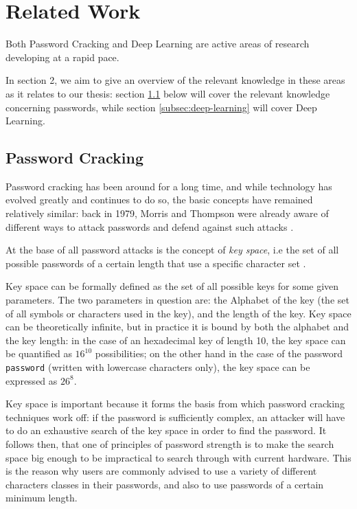 

\section{Related Work}\label{sec:related_work}
Both Password Cracking and Deep Learning are active areas of research developing at a rapid pace.

In section 2, we aim to give an overview of the relevant knowledge in these areas as it relates to our thesis: section \ref{subsec:password_cracking} below will cover the relevant knowledge concerning passwords, while section \ref{subsec:deep-learning} will cover Deep Learning.

\subsection{Password Cracking}\label{subsec:password_cracking}
Password cracking has been around for a long time, and while technology has evolved greatly and continues to do so, the basic concepts have remained relatively similar:
back in 1979, Morris and Thompson were already aware of different ways to attack passwords and defend against such attacks \cite{Thompson1979}.

At the base of all password attacks is the concept of \emph{key space}, i.e the set of all possible passwords of a certain length that use a specific character set \cite{Thompson1979,hash_cat_mask_attack}. 

Key space can be formally defined as the set of all possible keys for some given parameters. The two parameters in question are: the Alphabet of the key (the set of all symbols or characters used in the key), and the length of the key.
Key space can be theoretically infinite, but in practice it is bound by both the alphabet and the key length: in the case of an hexadecimal key of length 10, the key space can be quantified as $16^{10}$ possibilities; on the other hand in the case of the password \texttt{password} (written with lowercase characters only), the key space can be expressed as $26^8$. %

Key space is important because it forms the basis from which password cracking techniques work off: if the password is sufficiently complex, an attacker will have to do an exhaustive search of the key space in order to find the password. 
It follows then, that one of principles of password strength is to make the search space big enough to be impractical to search through with current hardware.
This is the reason why users are commonly advised to use a variety of different characters classes in their passwords, and also to use passwords of a certain minimum length.

